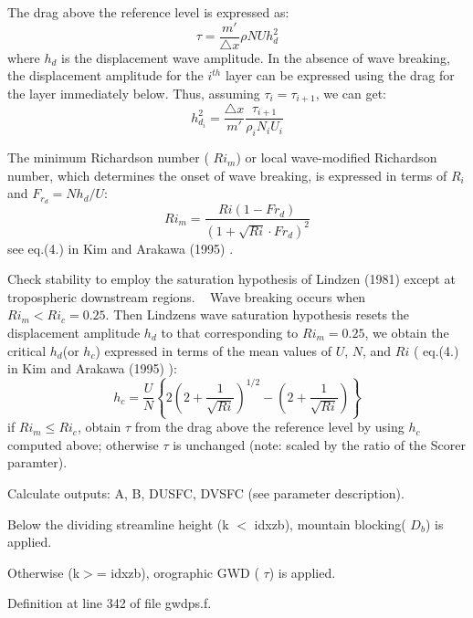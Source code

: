\begin{DoxyItemize}
\begin{DoxyItemize}
\item The drag above the reference level is expressed as\+: \[ \tau=\frac{m'}{\triangle x}\rho NUh_d^2 \] where $h_{d}$ is the displacement wave amplitude. In the absence of wave breaking, the displacement amplitude for the $i^{th}$ layer can be expressed using the drag for the layer immediately below. Thus, assuming $\tau_i=\tau_{i+1}$, we can get\+: \[ h_{d_i}^2=\frac{\triangle x}{m'}\frac{\tau_{i+1}}{\rho_{i}N_{i}U_{i}} \]
\end{DoxyItemize}
\item The minimum Richardson number ( $Ri_{m}$) or local wave-\/modified Richardson number, which determines the onset of wave breaking, is expressed in terms of $R_{i}$ and $F_{r_{d}}=Nh_{d}/U$\+: \[ Ri_{m}=\frac{Ri(1-Fr_{d})}{(1+\sqrt{Ri}\cdot Fr_{d})^{2}} \] see eq.(4.) in Kim and Arakawa (1995) \cite{kim_and_arakawa_1995}.
\begin{DoxyItemize}
\item Check stability to employ the \textquotesingle{}saturation hypothesis\textquotesingle{} of Lindzen (1981) \cite{lindzen_1981} except at tropospheric downstream regions. ~\newline
 Wave breaking occurs when $Ri_{m}<Ri_{c}=0.25$. Then Lindzen\textquotesingle{}s wave saturation hypothesis resets the displacement amplitude $h_{d}$ to that corresponding to $Ri_{m}=0.25$, we obtain the critical $h_{d}$(or $h_{c}$) expressed in terms of the mean values of $U$, $N$, and $Ri$ ( eq.(4.) in Kim and Arakawa (1995) \cite{kim_and_arakawa_1995})\+: \[ h_{c}=\frac{U}{N}\left\{2(2+\frac{1}{\sqrt{Ri}})^{1/2}-(2+\frac{1}{\sqrt{Ri}})\right\} \] if $Ri_{m}\leq Ri_{c}$, obtain $\tau$ from the drag above the reference level by using $h_{c}$ computed above; otherwise $\tau$ is unchanged (note\+: scaled by the ratio of the Scorer paramter).
\end{DoxyItemize}
\item Calculate outputs\+: A, B, D\+U\+S\+FC, D\+V\+S\+FC (see parameter description).
\begin{DoxyItemize}
\item Below the dividing streamline height (k $<$ idxzb), mountain blocking( $D_{b}$) is applied.
\item Otherwise (k$>$= idxzb), orographic G\+WD ( $\tau$) is applied. 
\end{DoxyItemize}
\end{DoxyItemize}

Definition at line 342 of file gwdps.\+f.

